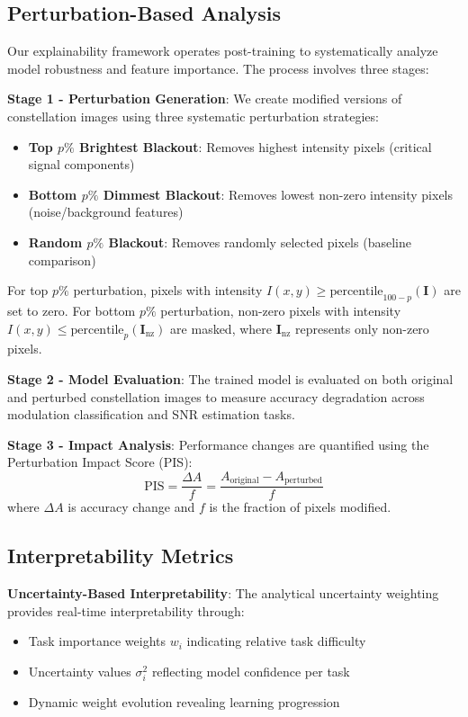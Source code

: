 \documentclass[conference]{IEEEtran}
\begin{document}
\subsection{Perturbation-Based Analysis}

Our explainability framework operates post-training to systematically analyze model robustness and feature importance. The process involves three stages:

\textbf{Stage 1 - Perturbation Generation}: We create modified versions of constellation images using three systematic perturbation strategies:
\begin{itemize}
\item \textbf{Top $p\%$ Brightest Blackout}: Removes highest intensity pixels (critical signal components)
\item \textbf{Bottom $p\%$ Dimmest Blackout}: Removes lowest non-zero intensity pixels (noise/background features)  
\item \textbf{Random $p\%$ Blackout}: Removes randomly selected pixels (baseline comparison)
\end{itemize}

For top $p\%$ perturbation, pixels with intensity $I(x,y) \geq \text{percentile}_{100-p}(\mathbf{I})$ are set to zero. For bottom $p\%$ perturbation, non-zero pixels with intensity $I(x,y) \leq \text{percentile}_p(\mathbf{I}_{\text{nz}})$ are masked, where $\mathbf{I}_{\text{nz}}$ represents only non-zero pixels.

\textbf{Stage 2 - Model Evaluation}: The trained model is evaluated on both original and perturbed constellation images to measure accuracy degradation across modulation classification and SNR estimation tasks.

\textbf{Stage 3 - Impact Analysis}: Performance changes are quantified using the Perturbation Impact Score (PIS):
\begin{equation}
\text{PIS} = \frac{\Delta A}{f} = \frac{A_{\text{original}} - A_{\text{perturbed}}}{f}
\end{equation}
where $\Delta A$ is accuracy change and $f$ is the fraction of pixels modified.

\subsection{Interpretability Metrics}

\textbf{Uncertainty-Based Interpretability}: The analytical uncertainty weighting provides real-time interpretability through:
\begin{itemize}
\item Task importance weights $w_i$ indicating relative task difficulty
\item Uncertainty values $\sigma_i^2$ reflecting model confidence per task
\item Dynamic weight evolution revealing learning progression
\end{itemize}
\end{document}
